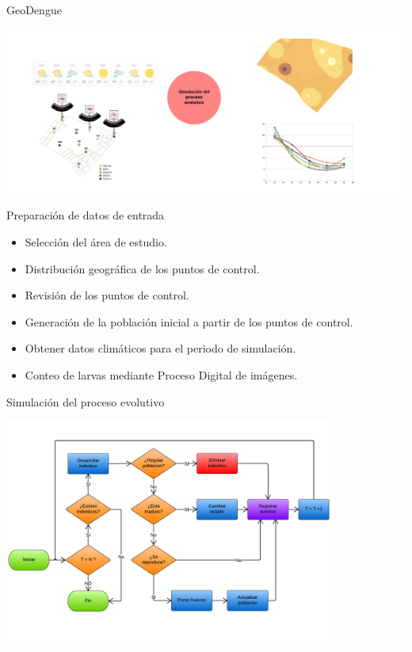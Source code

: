 \begin{frame}[c]{GeoDengue}
  \begin{center}
      \includegraphics[width=\textwidth]{./graphics/propuesta.png}
  \end{center}
\end{frame}

\begin{frame}[c]{Preparación de datos de entrada}
  \begin{center}
    \begin{itemize}
      \item Selección del área de estudio.
      \item Distribución geográfica de los puntos de control.
      \item Revisión de los puntos de control.
      \item Generación de la población inicial a partir de los puntos de control.
      \item Obtener datos climáticos para el periodo de simulación.
      \item Conteo de larvas mediante Proceso Digital de imágenes.
    \end{itemize}
  \end{center}
\end{frame}

\begin{frame}[c]{Simulación del proceso evolutivo}
  \begin{center}
    \includegraphics[height=7.5cm]{./graphics/algoritmo-propuesto.png}
  \end{center}
\end{frame}

